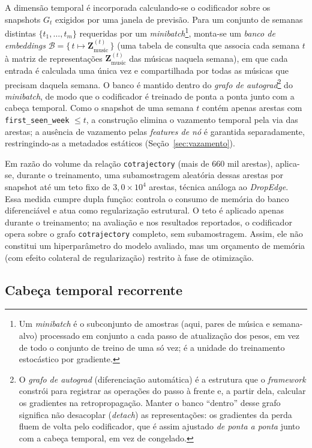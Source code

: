 A dimensão temporal é incorporada calculando-se o codificador sobre os snapshots $G_t$ exigidos por uma janela de previsão. Para um conjunto de semanas distintas $\{t_1, \dots, t_m\}$ requeridas por um \emph{minibatch}\footnote{Um \emph{minibatch} é o subconjunto de amostras (aqui, pares de música e semana-alvo) processado em conjunto a cada passo de atualização dos pesos, em vez de todo o conjunto de treino de uma só vez; é a unidade do treinamento estocástico por gradiente.}, monta-se um \emph{banco de embeddings} $\mathcal{B} = \{\, t \mapsto \mathbf{Z}^{(t)}_{\text{music}} \,\}$ (uma tabela de consulta que associa cada semana $t$ à matriz de representações $\mathbf{Z}^{(t)}_{\text{music}}$ das músicas naquela semana), em que cada entrada é calculada uma única vez e compartilhada por todas as músicas que precisam daquela semana. O banco é mantido dentro do \emph{grafo de autograd}\footnote{O \emph{grafo de autograd} (diferenciação automática) é a estrutura que o \textit{framework} constrói para registrar as operações do passo à frente e, a partir dela, calcular os gradientes na retropropagação. Manter o banco ``dentro'' desse grafo significa não desacoplar (\emph{detach}) as representações: os gradientes da perda fluem de volta pelo codificador, que é assim ajustado \emph{de ponta a ponta} junto com a cabeça temporal, em vez de congelado.} do \emph{minibatch}, de modo que o codificador é treinado de ponta a ponta junto com a cabeça temporal. Como o snapshot de uma semana $t$ contém apenas arestas com \texttt{first\_seen\_week} $\leq t$, a construção elimina o vazamento temporal pela via das arestas; a ausência de vazamento pelas \emph{features de nó} é garantida separadamente, restringindo-as a metadados estáticos (Seção~\ref{sec:vazamento}).

Em razão do volume da relação \texttt{cotrajectory} (mais de 660 mil arestas), aplica-se, durante o treinamento, uma subamostragem aleatória dessas arestas por snapshot até um teto fixo de $3{,}0 \times 10^{4}$ arestas, técnica análoga ao \emph{DropEdge}. Essa medida cumpre dupla função: controla o consumo de memória do banco diferenciável e atua como regularização estrutural. O teto é aplicado apenas durante o treinamento; na avaliação e nos resultados reportados, o codificador opera sobre o grafo \texttt{cotrajectory} completo, sem subamostragem. Assim, ele não constitui um hiperparâmetro do modelo avaliado, mas um orçamento de memória (com efeito colateral de regularização) restrito à fase de otimização.

\subsection{Cabeça temporal recorrente}

